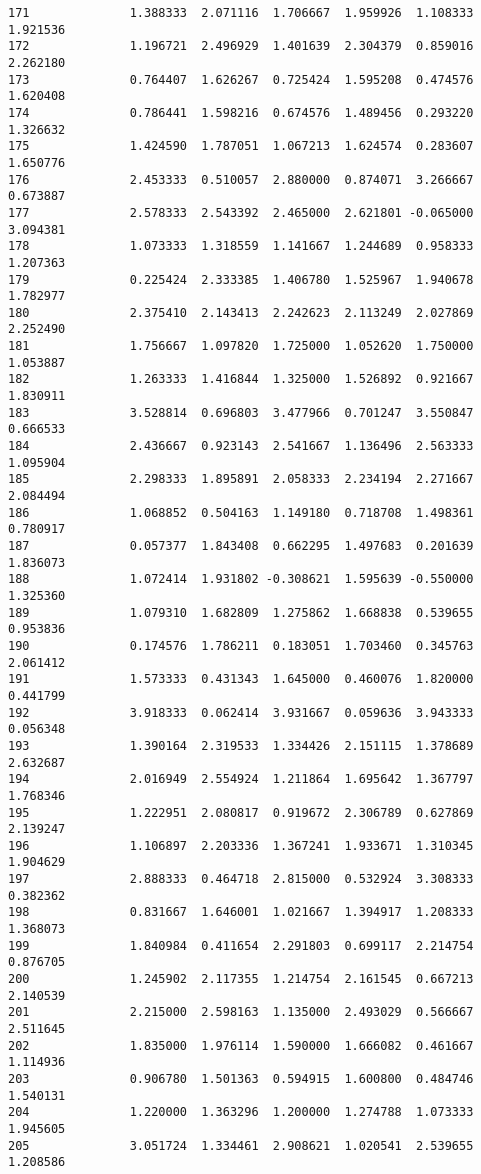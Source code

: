 \documentclass[11pt]{article}
\begin{document}
\begin{Verbatim}[commandchars=\\\{\}]
171              1.388333  2.071116  1.706667  1.959926  1.108333  1.921536
172              1.196721  2.496929  1.401639  2.304379  0.859016  2.262180
173              0.764407  1.626267  0.725424  1.595208  0.474576  1.620408
174              0.786441  1.598216  0.674576  1.489456  0.293220  1.326632
175              1.424590  1.787051  1.067213  1.624574  0.283607  1.650776
176              2.453333  0.510057  2.880000  0.874071  3.266667  0.673887
177              2.578333  2.543392  2.465000  2.621801 -0.065000  3.094381
178              1.073333  1.318559  1.141667  1.244689  0.958333  1.207363
179              0.225424  2.333385  1.406780  1.525967  1.940678  1.782977
180              2.375410  2.143413  2.242623  2.113249  2.027869  2.252490
181              1.756667  1.097820  1.725000  1.052620  1.750000  1.053887
182              1.263333  1.416844  1.325000  1.526892  0.921667  1.830911
183              3.528814  0.696803  3.477966  0.701247  3.550847  0.666533
184              2.436667  0.923143  2.541667  1.136496  2.563333  1.095904
185              2.298333  1.895891  2.058333  2.234194  2.271667  2.084494
186              1.068852  0.504163  1.149180  0.718708  1.498361  0.780917
187              0.057377  1.843408  0.662295  1.497683  0.201639  1.836073
188              1.072414  1.931802 -0.308621  1.595639 -0.550000  1.325360
189              1.079310  1.682809  1.275862  1.668838  0.539655  0.953836
190              0.174576  1.786211  0.183051  1.703460  0.345763  2.061412
191              1.573333  0.431343  1.645000  0.460076  1.820000  0.441799
192              3.918333  0.062414  3.931667  0.059636  3.943333  0.056348
193              1.390164  2.319533  1.334426  2.151115  1.378689  2.632687
194              2.016949  2.554924  1.211864  1.695642  1.367797  1.768346
195              1.222951  2.080817  0.919672  2.306789  0.627869  2.139247
196              1.106897  2.203336  1.367241  1.933671  1.310345  1.904629
197              2.888333  0.464718  2.815000  0.532924  3.308333  0.382362
198              0.831667  1.646001  1.021667  1.394917  1.208333  1.368073
199              1.840984  0.411654  2.291803  0.699117  2.214754  0.876705
200              1.245902  2.117355  1.214754  2.161545  0.667213  2.140539
201              2.215000  2.598163  1.135000  2.493029  0.566667  2.511645
202              1.835000  1.976114  1.590000  1.666082  0.461667  1.114936
203              0.906780  1.501363  0.594915  1.600800  0.484746  1.540131
204              1.220000  1.363296  1.200000  1.274788  1.073333  1.945605
205              3.051724  1.334461  2.908621  1.020541  2.539655  1.208586

\end{Verbatim}
\end{document}
